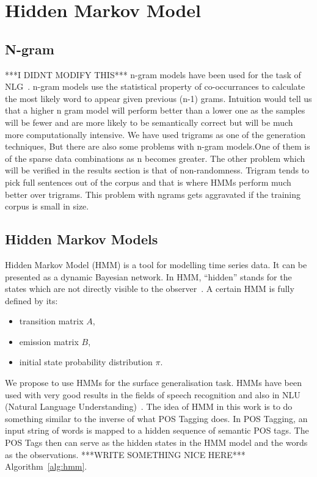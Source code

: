 \documentclass[a4paper,12pt]{article}
\begin{document}
\section{Hidden Markov Model}
\label{sec:method}

\subsection{N-gram}
***I DIDNT MODIFY THIS***
n-gram models have been used for the task of NLG~\cite{nlgngram}. n-gram models use the
statistical property of co-occurrances to calculate the most likely word to
appear given previous (n-1) grams. Intuition would tell us that a higher n gram
model will perform better than a lower one as the samples will be fewer and are
more likely to be semantically correct but will be much more computationally
intensive. We have used trigrams as one of the generation techniques, But there 
are  also some problems with n-gram models.One of them 
is of the sparse data combinations as n becomes greater. The other problem which will be 
verified in the results section is that of non-randomness. Trigram tends to 
pick full sentences out of the corpus and that is where HMMs perform much
better over trigrams. This problem with ngrams gets aggravated if the training
corpus is small in size. 


\subsection{Hidden Markov Models}
Hidden Markov Model (HMM) is a tool for modelling time series data.
It can be presented as a dynamic Bayesian network. In HMM, ``hidden''
stands for the states which are not directly visible to the observer~\cite{hmm}.
A certain HMM is fully defined by its:
\begin{itemize}
  \item transition matrix $A$,
  \item emission matrix $B$,
  \item initial state probability distribution $\pi$.
\end{itemize}

We propose to use HMMs for the surface generalisation task. HMMs have been used
with very good results in the fields of speech recognition and also in NLU
(Natural Language Understanding)~\cite{hmmsr}. The idea of HMM in this work is
to do something similar to the inverse of what POS Tagging does. In POS
Tagging, an input string of words is mapped to a hidden sequence of semantic POS
tags. The POS Tags then can serve as the hidden states in the HMM model and the
words as the observations. ***WRITE SOMETHING NICE HERE***
Algorithm~\ref{alg:hmm}.
\end{document}
